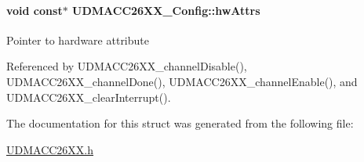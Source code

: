 \paragraph[{hw\+Attrs}]{\setlength{\rightskip}{0pt plus 5cm}void const$\ast$ U\+D\+M\+A\+C\+C26\+X\+X\+\_\+\+Config\+::hw\+Attrs}\label{struct_u_d_m_a_c_c26_x_x___config_a394867c60268267c4c503fb10100d960}
Pointer to hardware attribute 

Referenced by U\+D\+M\+A\+C\+C26\+X\+X\+\_\+channel\+Disable(), U\+D\+M\+A\+C\+C26\+X\+X\+\_\+channel\+Done(), U\+D\+M\+A\+C\+C26\+X\+X\+\_\+channel\+Enable(), and U\+D\+M\+A\+C\+C26\+X\+X\+\_\+clear\+Interrupt().



The documentation for this struct was generated from the following file\+:\begin{DoxyCompactItemize}
\item 
\hyperlink{_u_d_m_a_c_c26_x_x_8h}{U\+D\+M\+A\+C\+C26\+X\+X.\+h}\end{DoxyCompactItemize}
